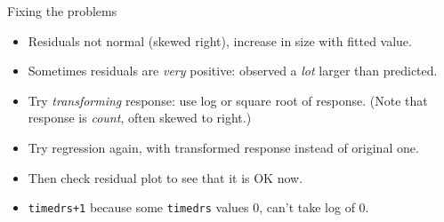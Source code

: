 \begin{frame}[fragile]{Fixing the problems}

  \begin{itemize}
  \item Residuals not normal (skewed right), increase in size with
    fitted value.
  \item Sometimes residuals are {\em very} positive: observed a {\em lot} larger than predicted.
  \item Try {\em  transforming} response: use log or square root of response. (Note that response is {\em count}, often skewed to right.)
  \item Try regression again, with transformed response instead of
    original one.
  \item Then check residual plot to see that it is OK now.

 
\begin{knitrout}
\color{fgcolor}\begin{kframe}
\begin{alltt}
\hlkwb{=}\hlopt{+}\hlstd{)}
\hlkwb{=}\hlopt{~}\hlopt{+}\hlopt{+}
\end{alltt}
\end{kframe}
\end{knitrout}
    
\item \texttt{timedrs+1}  because some \texttt{timedrs} values 0,
  can't take log of 0.
  \end{itemize}
  
\end{frame}


